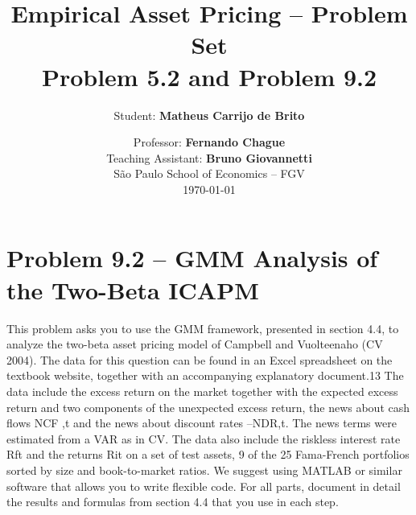 \documentclass[12pt]{article}
\title{\textbf{Empirical Asset Pricing -- Problem Set}\\[0.5em]
\large Problem 5.2 and Problem 9.2}
\author{Student: \textbf{Matheus Carrijo de Brito}}
\date{Professor: \textbf{Fernando Chague} \\ 
Teaching Assistant: \textbf{Bruno Giovannetti} \\[1em]
São Paulo School of Economics -- FGV\\
\today}
\begin{document}
\maketitle


\section*{Problem 9.2 -- GMM Analysis of the Two-Beta ICAPM}

This problem asks you to use the GMM framework, presented in section 4.4, to analyze
the two-beta asset pricing model of Campbell and Vuolteenaho (CV 2004). The data for
this question can be found in an Excel spreadsheet on the textbook website, together
with an accompanying explanatory document.13 The data include the excess return on
the market together with the expected excess return and two components of the unexpected excess return, the news about cash flows NCF ,t and the news about discount rates
–NDR,t. The news terms were estimated from a VAR as in CV. The data also include the
riskless interest rate Rft and the returns Rit on a set of test assets, 9 of the 25 Fama-French
portfolios sorted by size and book-to-market ratios.
We suggest using MATLAB or similar software that allows you to write flexible code.
For all parts, document in detail the results and formulas from section 4.4 that you use in
each step.
\end{document}
